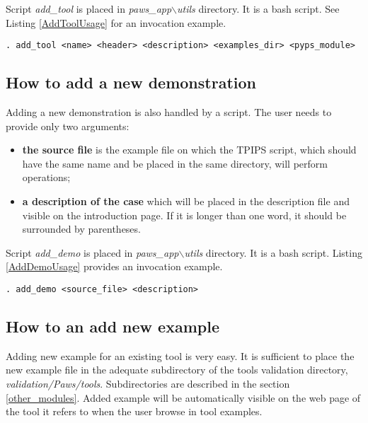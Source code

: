 Script \emph{add\_tool} is placed in \emph{paws\_app$\backslash$utils} directory. It is a bash script. See Listing \ref{AddToolUsage} for an invocation example. 

  \begin{lstlisting}
. add_tool <name> <header> <description> <examples_dir> <pyps_module>
  \end{lstlisting}

\subsection{How to add a new demonstration}
\label{add_demonstration}

Adding a new demonstration is also handled by a script. The user needs to provide only two arguments:

\begin{itemize}
  \item {\bf the source file} is the example file on which the TPIPS script, which should have the same name and be placed in the same directory, will perform operations;
  \item {\bf a description of the case} which will be placed in the description file and visible on the introduction page. If it is longer than one word, it should be surrounded by parentheses.
\end{itemize}

Script \emph{add\_demo} is placed in \emph{paws\_app$\backslash$utils} directory. It is a bash script. Listing \ref{AddDemoUsage} provides an invocation example.

  \begin{lstlisting}
. add_demo <source_file> <description>
  \end{lstlisting}

\subsection{How to an add new example}
\label{add_example}

Adding new example for an existing tool is very easy. It is sufficient to place the new example file in the adequate subdirectory of the tools validation directory, \emph{validation/Paws/tools}. Subdirectories are described in the section \ref{other_modules}. Added example will be automatically visible on the web page of the tool it refers to when the user browse in tool examples.

